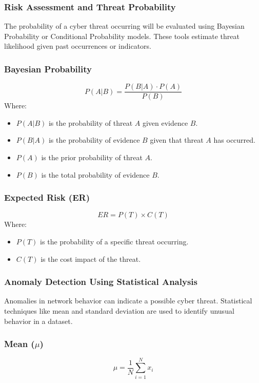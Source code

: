 \documentclass[a4paper,twoside,12pt]{report}
\begin{document}
\subsubsection{Risk Assessment and Threat Probability}
The probability of a cyber threat occurring will be evaluated using Bayesian Probability or Conditional Probability models. These tools estimate threat likelihood given past occurrences or indicators.

\subsubsection{Bayesian Probability}
\[
P(A|B) = \frac{P(B|A) \cdot P(A)}{P(B)}
\]
Where:
\begin{itemize}
    \item \( P(A|B) \) is the probability of threat \( A \) given evidence \( B \).
    \item \( P(B|A) \) is the probability of evidence \( B \) given that threat \( A \) has occurred.
    \item \( P(A) \) is the prior probability of threat \( A \).
    \item \( P(B) \) is the total probability of evidence \( B \).
\end{itemize}

\subsubsection{Expected Risk (ER)}
\[
ER = P(T) \times C(T)
\]
Where:
\begin{itemize}
    \item \( P(T) \) is the probability of a specific threat occurring.
    \item \( C(T) \) is the cost impact of the threat.
\end{itemize}

\subsubsection{Anomaly Detection Using Statistical Analysis}
Anomalies in network behavior can indicate a possible cyber threat. Statistical techniques like mean and standard deviation are used to identify unusual behavior in a dataset.

\subsubsection{Mean (\(\mu\))}
\[
\mu = \frac{1}{N} \sum_{i=1}^N x_i
\]
\end{document}
